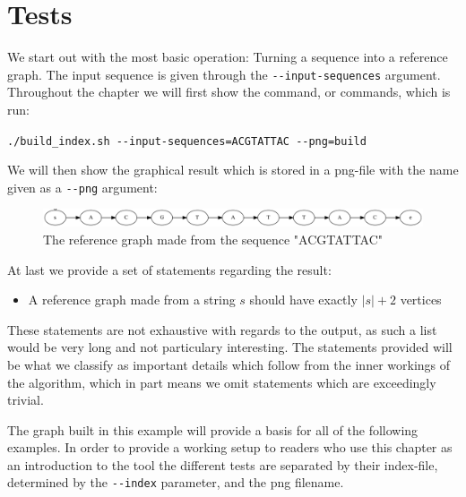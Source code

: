 \documentclass[thesis.tex]{subfiles}
\begin{document}
\section{Tests}
We start out with the most basic operation: Turning a sequence into a reference graph. The input sequence is given through the \texttt{-{}-input-sequences} argument. Throughout the chapter we will first show the command, or commands, which is run:\\
\par\noindent
\texttt{./build\_index.sh -{}-input-sequences=ACGTATTAC -{}-png=build}\\
\par\noindent
We will then show the graphical result which is stored in a png-file with the name given as a \texttt{-{}-png} argument:\\
\begin{figure}[!h]
  \begin{mdframed}
    \includegraphics[width=\textwidth]{output/build.png} 
  \end{mdframed}
  \caption{The reference graph made from the sequence "ACGTATTAC"}
  \label{fig:validation_ref}
\end{figure}
\par\noindent
At last we provide a set of statements regarding the result:
\begin{itemize}
\item A reference graph made from a string $s$ should have exactly $|s|+2$ vertices
\end{itemize}
These statements are not exhaustive with regards to the output, as such a list would be very long and not particulary interesting. The statements provided will be what we classify as important details which follow from the inner workings of the algorithm, which in part means we omit statements which are exceedingly trivial.\\
\par\noindent
The graph built in this example will provide a basis for all of the following examples. In order to provide a working setup to readers who use this chapter as an introduction to the tool the different tests are separated by their index-file, determined by the \texttt{-{}-index} parameter, and the png filename.
\end{document}
